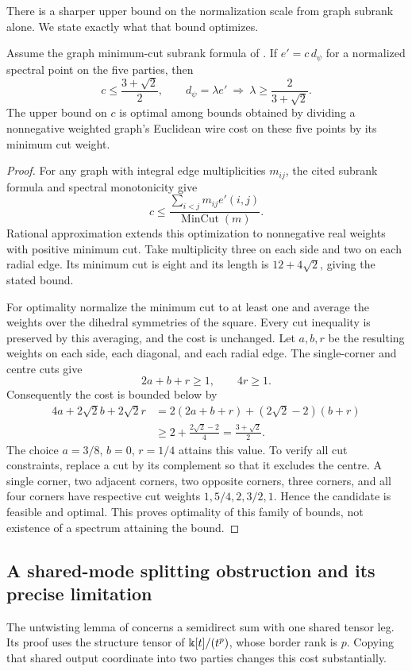 There is a sharper upper bound on the normalization scale from graph subrank alone. We state exactly what that bound optimizes.
\begin{proposition}\label{prop:centred-subrank-scale}
Assume the graph minimum-cut subrank formula of \cite[Theorem 1 and Section 3]{VC2017}. If $e'=c\,d_\psi$ for a normalized spectral point on the five parties, then
\[
 c\leq\frac{3+\sqrt2}{2},\qquad
 d_\psi=\lambda e'\ \Longrightarrow\
 \lambda\geq\frac{2}{3+\sqrt2}.
\]
The upper bound on $c$ is optimal among bounds obtained by dividing a nonnegative weighted graph's Euclidean wire cost on these five points by its minimum cut weight.
\end{proposition}
\begin{proof}
For any graph with integral edge multiplicities $m_{ij}$, the cited subrank formula and spectral monotonicity give
\[
 c\leq\frac{\sum_{i<j}m_{ij}e'(i,j)}
                   {\operatorname{MinCut}(m)}.
\]
Rational approximation extends this optimization to nonnegative real weights with positive minimum cut. Take multiplicity three on each side and two on each radial edge. Its minimum cut is eight and its length is $12+4\sqrt2$, giving the stated bound.

For optimality normalize the minimum cut to at least one and average the weights over the dihedral symmetries of the square. Every cut inequality is preserved by this averaging, and the cost is unchanged. Let $a,b,r$ be the resulting weights on each side, each diagonal, and each radial edge. The single-corner and centre cuts give
\[
 2a+b+r\geq1,\qquad4r\geq1.
\]
Consequently the cost is bounded below by
\begin{align*}
 4a+2\sqrt2b+2\sqrt2r
 &=2(2a+b+r)+(2\sqrt2-2)(b+r)\\
 &\geq2+\frac{2\sqrt2-2}{4}
   =\frac{3+\sqrt2}{2}.
\end{align*}
The choice $a=3/8$, $b=0$, $r=1/4$ attains this value. To verify all cut constraints, replace a cut by its complement so that it excludes the centre. A single corner, two adjacent corners, two opposite corners, three corners, and all four corners have respective cut weights $1,5/4,2,3/2,1$. Hence the candidate is feasible and optimal. This proves optimality of this family of bounds, not existence of a spectrum attaining the bound.
\end{proof}

\subsection{A shared-mode splitting obstruction and its precise limitation}
The untwisting lemma of \cite[Theorem 2.1, pp.~5--8]{Li2026} concerns a semidirect sum with one shared tensor leg. Its proof uses the structure tensor of $\Bbbk[t]/(t^p)$, whose border rank is $p$. Copying that shared output coordinate into two parties changes this cost substantially.

